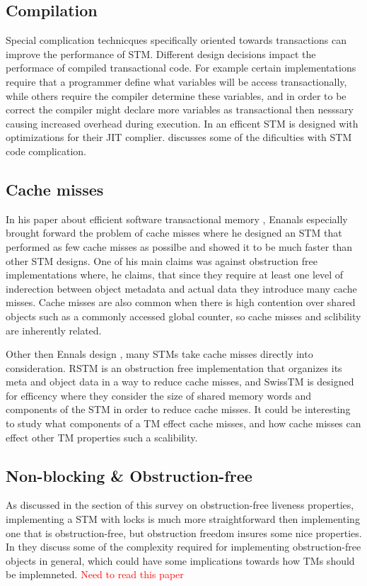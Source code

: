 \subsection{Compilation}
Special complication technicques specifically oriented towards transactions can improve the performance of STM.
Different design decisions impact the performace of compiled transactional code.
For example certain implementations require that a programmer define what variables will be access transactionally, while others require the compiler determine these variables, and in order to be correct the compiler might declare more variables as transactional then nesssary causing increased overhead during execution.
In \cite{1133985} an efficent STM is designed with optimizations for their JIT complier.
\cite{LPD-REPORT-2009-003} discusses some of the dificulties with STM code complication.

\subsection{Cache misses}
In his paper about efficient software transactional memory \cite{Ennals06softwaretransactional}, Enanals especially brought forward the problem of cache misses where he designed an STM that performed as few cache misses as possilbe and showed it to be much faster than other STM designs.
One of his main claims was against obstruction free implementations where, he claims, that since they require at least one level of inderection between object metadata and actual data they introduce many cache misses.
Cache misses are also common when there is high contention over shared objects such as a commonly accessed global counter, so cache misses and sclibility are inherently related.

Other then Ennals design \cite{Ennals05efficientsoftware}, many STMs take cache misses directly into consideration.
RSTM \cite{Marathe06loweringthe} is an obstruction free implementation that organizes its meta and object data in a way to reduce cache misses, and SwissTM \cite{1542494} is designed for efficency where they consider the size of shared memory words and components of the STM in order to reduce cache misses.
It could be interesting to study what components of a TM effect cache misses, and how cache misses can effect other TM properties such a scalibility.

\subsection{Non-blocking \& Obstruction-free}
As discussed in the section of this survey on obstruction-free liveness properties, implementing a STM with locks is much more straightforward then implementing one that is obstruction-free, but obstruction freedom insures some nice properties.
In \cite{1538908} they discuss some of the complexity required for implementing obstruction-free objects in general, which could have some implications towards how TMs should be implemneted.
\textcolor{Red}{Need to read this paper}

